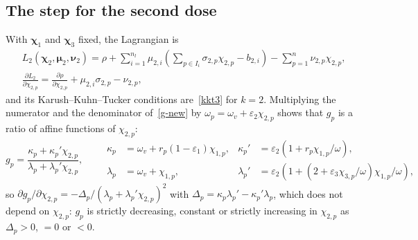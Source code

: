 \documentclass[11pt]{article}
\theoremstyle{plain}
\theoremstyle{remark}
\numberwithin{equation}{section}
\begin{document}
\subsection{The step for the second dose}\label{sec-step2}
With $\bm\chi_1$ and $\bm\chi_3$ fixed, the Lagrangian is
\begin{equation}\label{lagrangian2}
\begin{aligned}
&L_2(\bm\chi_2,\bm\mu_2,\bm\nu_2)=\rho
+\sum_{i=1}^{n_l}\mu_{2,i}\left(\sum_{p\in I_i}\sigma_{2,p}\chi_{2,p}-b_{2,i}\right)
-\sum_{p=1}^n\nu_{2,p}\chi_{2,p},\\
&\frac{\partial L_2}{\partial\chi_{2,p}}=\frac{\partial\rho}{\partial\chi_{2,p}}
+\mu_{2,i}\sigma_{2,p}-\nu_{2,p},
\end{aligned}
\end{equation}
and its Karush--Kuhn--Tucker conditions are~\eqref{kkt3} for $k=2$.
Multiplying the numerator and the denominator of~\eqref{g-new} by
$\omega_p=\omega_v+\varepsilon_2\chi_{2,p}$ shows that $g_p$ is a ratio of affine
functions of $\chi_{2,p}$:
\begin{equation*}
g_p=\frac{\kappa_p+\kappa_p'\chi_{2,p}}{\lambda_p+\lambda_p'\chi_{2,p}},\qquad
\begin{aligned}
\kappa_p&=\omega_v+r_p(1-\varepsilon_1)\chi_{1,p}, &
\kappa_p'&=\varepsilon_2\left(1+r_p\chi_{1,p}/\omega\right),\\
\lambda_p&=\omega_v+\chi_{1,p}, &
\lambda_p'&=\varepsilon_2\left(1+(2+\varepsilon_3\chi_{3,p}/\omega)\chi_{1,p}/\omega\right),
\end{aligned}
\end{equation*}
so $\partial g_p/\partial\chi_{2,p}=-\Delta_p/(\lambda_p+\lambda_p'\chi_{2,p})^2$
with $\Delta_p=\kappa_p\lambda_p'-\kappa_p'\lambda_p$, which does not depend on
$\chi_{2,p}$: $g_p$ is strictly decreasing, constant or strictly increasing
in $\chi_{2,p}$ as $\Delta_p>0$, $=0$ or $<0$.
\end{document}
